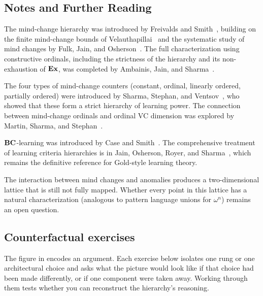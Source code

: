 \subsection*{Notes and Further Reading}

The mind-change hierarchy was introduced by Freivalds and
Smith~\cite{FreivaldsSmith1993}, building on the finite mind-change
bounds of Velauthapillai~\cite{Velauthapillai1989} and the systematic
study of mind changes by Fulk, Jain, and
Osherson~\cite{FulkJainOsherson1995}.  The full characterization using
constructive ordinals, including the strictness of the hierarchy and
its non-exhaustion of $\mathbf{Ex}$, was completed by Ambainis, Jain, and
Sharma~\cite{AmbainisJainSharma1999}.

The four types of mind-change counters (constant, ordinal, linearly
ordered, partially ordered) were introduced by Sharma, Stephan, and
Ventsov~\cite{SharmaStephanVentsov2004}, who showed that these form a
strict hierarchy of learning power.  The connection between
mind-change ordinals and ordinal VC dimension was explored by Martin,
Sharma, and Stephan~\cite{MartinSharmaStephan2006}.

$\mathbf{BC}$-learning was introduced by Case and Smith~\cite{CaseSmith1983}.
The comprehensive treatment of learning criteria hierarchies is in
Jain, Osherson, Royer, and Sharma~\cite{JainOshersonRoyerSharma1999},
which remains the definitive reference for Gold-style learning theory.

The interaction between mind changes and anomalies produces a
two-dimensional lattice that is still not fully mapped.  Whether every
point in this lattice has a natural characterization (analogous to
pattern language unions for $\omega^n$) remains an open question.


\subsection*{Counterfactual exercises}

The figure in  encodes an argument.
Each exercise below isolates one rung or one architectural choice and asks
what the picture would look like if that choice had been made differently,
or if one component were taken away.  Working through them tests
whether you can reconstruct the hierarchy's reasoning.

